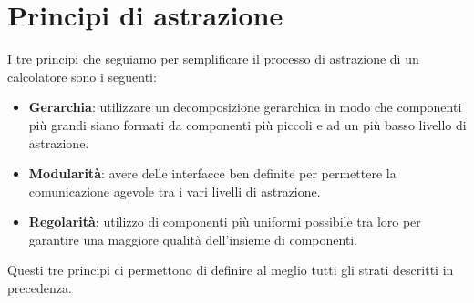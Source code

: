 \section{Principi di astrazione}
I tre principi che seguiamo per semplificare il processo di astrazione di un calcolatore sono i
seguenti:
\begin{itemize}
	\item \textbf{Gerarchia}: utilizzare un decomposizione gerarchica in modo che componenti più
	      grandi siano formati da componenti più piccoli e ad un più basso livello di astrazione.
	\item \textbf{Modularità}: avere delle interfacce ben definite per permettere la comunicazione
	      agevole tra i vari livelli di astrazione.
	\item \textbf{Regolarità}: utilizzo di componenti più uniformi possibile tra loro per garantire
	      una maggiore qualità dell'insieme di componenti.
\end{itemize}
Questi tre principi ci permettono di definire al meglio tutti gli strati descritti in precedenza.